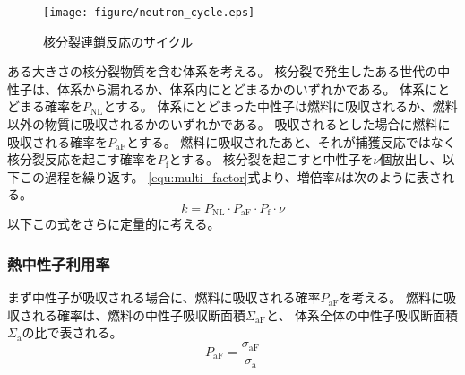 \begin{figure}[htbp]
  \centering
  \texttt{[image: figure/neutron\_cycle.eps]}
  \caption{核分裂連鎖反応のサイクル}
  \label{fig:neutron_cycle}
\end{figure}

ある大きさの核分裂物質を含む体系を考える。
核分裂で発生したある世代の中性子は、体系から漏れるか、体系内にとどまるかのいずれかである。
体系にとどまる確率を$P_\text{NL}$とする。
体系にとどまった中性子は燃料に吸収されるか、燃料以外の物質に吸収されるかのいずれかである。
吸収されるとした場合に燃料に吸収される確率を$P_\text{aF}$とする。
燃料に吸収されたあと、それが捕獲反応ではなく核分裂反応を起こす確率を$P_\text{f}$とする。
核分裂を起こすと中性子を$\nu$個放出し、以下この過程を繰り返す。
\ref{equ:multi_factor}式より、増倍率$k$は次のように表される。
\begin{equation}
  k = P_\text{NL} \cdot P_\text{aF} \cdot P_\text{f} \cdot \nu
\end{equation}
以下この式をさらに定量的に考える。

\subsubsection{熱中性子利用率}
まず中性子が吸収される場合に、燃料に吸収される確率$P_\text{aF}$を考える。
燃料に吸収される確率は、燃料の中性子吸収断面積$\Sigma_\text{aF}$と、
体系全体の中性子吸収断面積$\Sigma_\text{a}$の比で表される。
\begin{equation}
  P_\text{aF} = \frac{\sigma_\text{aF}}{\sigma_\text{a}}
\end{equation}

\printbibliography[segment=\therefsegment,heading=subbibliography]

\newpage
